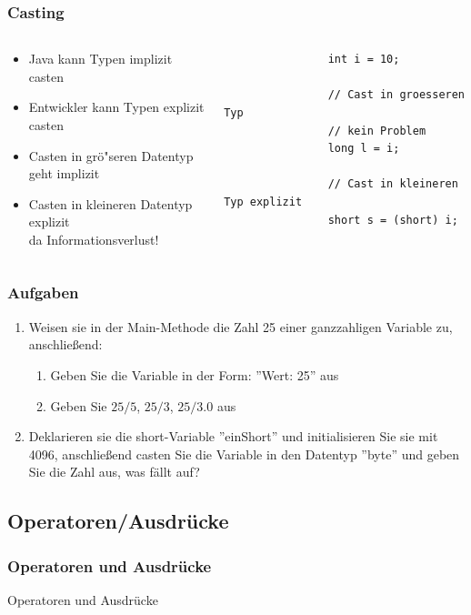 \begin{frame}[fragile]
	\frametitle{Casting}
	\begin{columns}
		\begin{column}{0.5\textwidth}
			\small
			\begin{itemize}
				\item Java kann Typen implizit casten
				\item Entwickler kann Typen explizit casten
				\item Casten in gr\"o"seren Datentyp geht implizit
				\item Casten in kleineren Datentyp explizit\\
						da Informationsverlust!
			\end{itemize}
		\end{column}
		\begin{column}{0.5\textwidth}
			\begin{lstlisting}
				int i = 10;
				
				// Cast in groesseren Typ 
				// kein Problem
				long l = i;
				
				// Cast in kleineren Typ explizit
				short s = (short) i;
			\end{lstlisting}
		\end{column}
	\end{columns}
\end{frame}

\begin{frame}
	\frametitle{Aufgaben}
	\begin{enumerate}
	  \item Weisen sie in der Main-Methode die Zahl 25 einer ganzzahligen Variable
	  zu, anschließend:
	  \begin{enumerate}
	    \item Geben Sie die Variable in der Form: ''Wert: 25'' aus
	    \item Geben Sie $25/5$, $25/3$, $25/3.0$ aus
	  \end{enumerate} 
	  \item Deklarieren sie die short-Variable ''einShort'' und initialisieren Sie
	  sie mit 4096, anschließend casten Sie die Variable in den Datentyp ''byte'' und
	  geben Sie die Zahl aus, was fällt auf?
	\end{enumerate}
\end{frame}

\subsection{Operatoren/Ausdrücke}
\begin{frame}[fragile]
	\frametitle{Operatoren und Ausdrücke}
	\huge Operatoren und Ausdrücke
\end{frame}


